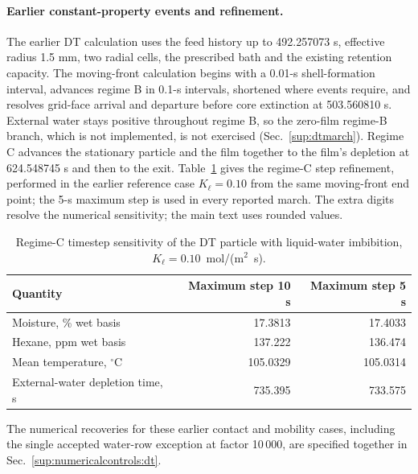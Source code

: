 \paragraph{Earlier constant-property events and refinement.}
The earlier DT calculation uses the feed history up to 492.257073 s,
effective radius 1.5 mm, two radial cells, the prescribed bath and the
existing retention capacity. The moving-front calculation begins with a
0.01-s shell-formation interval, advances regime B in 0.1-s intervals,
shortened where events require, and resolves grid-face arrival and departure
before core extinction at 503.560810 s. External water stays positive
throughout regime B, so the zero-film regime-B branch, which is not
implemented, is not exercised (Sec.~\ref{sup:dtmarch}).
Regime C advances the stationary particle and the film together to the
film's depletion at 624.548745 s and then to the exit.
Table~\ref{tab:finitecontact:refinement} gives the regime-C step
refinement, performed in the earlier reference case $K_\ell=0.10$ from the
same moving-front end point; the 5-s maximum step is used in every
reported march. The extra digits resolve the numerical sensitivity; the main
text uses rounded values.

\begin{table}[htbp]\centering\small
\caption{Regime-C timestep sensitivity of the DT particle with liquid-water
imbibition, $K_\ell=0.10$~mol/(m$^2$~s).}
\label{tab:finitecontact:refinement}
\begin{tabular}{@{}lrr@{}}\toprule
Quantity & Maximum step 10 s & Maximum step 5 s\\\midrule
Moisture, \% wet basis & 17.3813 & 17.4033\\
Hexane, ppm wet basis & 137.222 & 136.474\\
Mean temperature, $^\circ$C & 105.0329 & 105.0314\\
External-water depletion time, s & 735.395 & 733.575\\
\bottomrule\end{tabular}\end{table}

The numerical recoveries for these earlier contact and mobility cases,
including the single accepted water-row exception at factor 10\,000,
are specified together in Sec.~\ref{sup:numericalcontrols:dt}.

